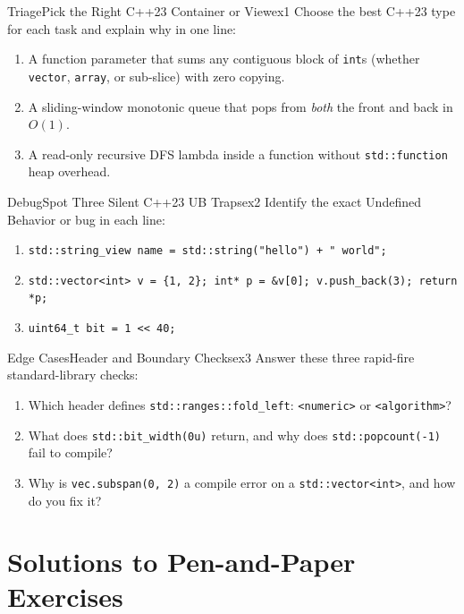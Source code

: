\documentclass[11pt,a4paper]{article}
\begin{document}
\begin{tryitbox}{Triage}{Pick the Right C++23 Container or View}{ex1}
Choose the best C++23 type for each task and explain why in one line:
\begin{enumerate}[itemsep=1pt, topsep=2pt]
    \item A function parameter that sums any contiguous block of \texttt{int}s (whether \texttt{vector}, \texttt{array}, or sub-slice) with zero copying.
    \item A sliding-window monotonic queue that pops from \emph{both} the front and back in $O(1)$.
    \item A read-only recursive DFS lambda inside a function without \texttt{std::function} heap overhead.
\end{enumerate}
\end{tryitbox}

\begin{tryitbox}{Debug}{Spot Three Silent C++23 UB Traps}{ex2}
Identify the exact Undefined Behavior or bug in each line:
\begin{enumerate}[itemsep=1pt, topsep=2pt]
    \item \texttt{std::string\_view name = std::string("hello") + " world";}
    \item \texttt{std::vector<int> v = \{1, 2\}; int* p = \&v[0]; v.push\_back(3); return *p;}
    \item \texttt{uint64\_t bit = 1 << 40;}
\end{enumerate}
\end{tryitbox}

\begin{tryitbox}{Edge Cases}{Header and Boundary Checks}{ex3}
Answer these three rapid-fire standard-library checks:
\begin{enumerate}[itemsep=1pt, topsep=2pt]
    \item Which header defines \texttt{std::ranges::fold\_left}: \texttt{<numeric>} or \texttt{<algorithm>}?
    \item What does \texttt{std::bit\_width(0u)} return, and why does \texttt{std::popcount(-1)} fail to compile?
    \item Why is \texttt{vec.subspan(0, 2)} a compile error on a \texttt{std::vector<int>}, and how do you fix it?
\end{enumerate}
\end{tryitbox}

\section*{Solutions to Pen-and-Paper Exercises}
\end{document}
